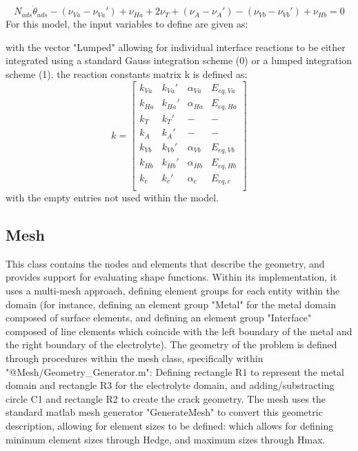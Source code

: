 \documentclass[3p]{elsarticle} %
\begin{document}
\begin{equation}
    N_{ads} \dot{\theta}_{ads} - (\nu_{Va}-\nu_{Va}') + \nu_{Ha} + 2 \nu_T + (\nu_A-\nu_A') - (\nu_{Vb}-\nu_{Vb}') + \nu_{Hb} = 0
\end{equation}
For this model, the input variables to define are given as:

with the vector "Lumped" allowing for individual interface reactions to be either integrated using a standard Gauss integration scheme (0) or a lumped integration scheme (1). the reaction constants matrix k is defined as:
\begin{equation}
	k = \begin{bmatrix} 
	k_{Va} & k_{Va}' & \alpha_{Va} & E_{eq,Va} \\ 
	k_{Ha} & k_{Ha}' & \alpha_{Ha} & E_{eq,Ha} \\ 
	k_{T} & k_{T}' & - & - \\ 
	k_{A} & k_{A}' & - & - \\ 
	k_{Vb} & k_{Vb}' & \alpha_{Vb} & E_{eq,Vb} \\ 
	k_{Hb} & k_{Hb}' & \alpha_{Hb} & E_{eq,Hb} \\ 
	k_{c} & k_{c}' & \alpha_{c} & E_{eq,c} \\ 
	\end{bmatrix}
\end{equation}
with the empty entries not used within the model.


\subsection{Mesh}
This class contains the nodes and elements that describe the geometry, and provides support for evaluating shape functions. Within its implementation, it uses a multi-mesh approach, defining element groups for each entity within the domain (for instance, defining an element group "Metal" for the metal domain composed of surface elements, and defining an element group "Interface" composed of line elements which coincide with the left boundary of the metal and the right boundary of the electrolyte). The geometry of the problem is defined through procedures within the mesh class, specifically within "@Mesh/Geometry{\_}Generator.m":
%
Defining rectangle R1 to represent the metal domain and rectangle R3 for the electrolyte domain, and adding/substracting circle C1 and rectangle R2 to create the crack geometry. The mesh uses the standard matlab mesh generator "GenerateMesh" to convert this geometric description, allowing for element sizes to be defined:
%
which allows for defining minimum element sizes through Hedge, and maximum sizes through Hmax. 
\end{document}
